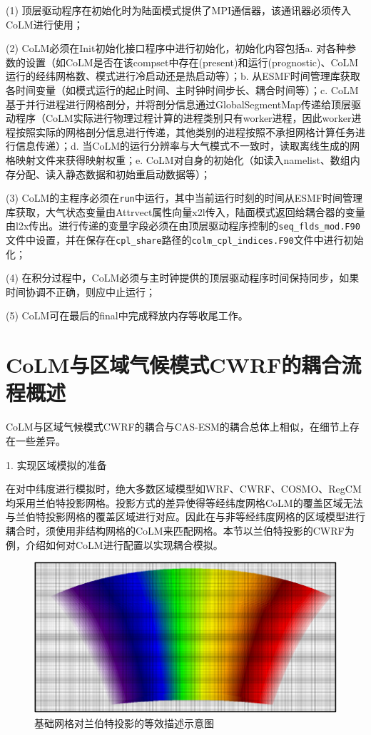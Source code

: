 (1) 顶层驱动程序在初始化时为陆面模式提供了MPI通信器，该通讯器必须传入CoLM进行使用；

(2) CoLM必须在Init初始化接口程序中进行初始化，初始化内容包括a. 对各种参数的设置（如CoLM是否在该compset中存在(present)和运行(prognostic)、CoLM运行的经纬网格数、模式进行冷启动还是热启动等）；b. 从ESMF时间管理库获取各时间变量（如模式运行的起止时间、主时钟时间步长、耦合时间等）；c. CoLM基于并行进程进行网格剖分，并将剖分信息通过GlobalSegmentMap传递给顶层驱动程序（CoLM实际进行物理过程计算的进程类别只有worker进程，因此worker进程按照实际的网格剖分信息进行传递，其他类别的进程按照不承担网格计算任务进行信息传递）；d. 当CoLM的运行分辨率与大气模式不一致时，读取离线生成的网格映射文件来获得映射权重；e. CoLM对自身的初始化（如读入namelist、数组内存分配、读入静态数据和初始重启动数据等）；

(3) CoLM的主程序必须在\texttt{run}中运行，其中当前运行时刻的时间从ESMF时间管理库获取，大气状态变量由Attrvect属性向量x2l传入，陆面模式返回给耦合器的变量由l2x传出。进行传递的变量字段必须在由顶层驱动程序控制的\texttt{seq\_flds\_mod.F90}文件中设置，并在保存在\texttt{cpl\_share}路径的\texttt{colm\_cpl\_indices.F90}文件中进行初始化；

(4) 在积分过程中，CoLM必须与主时钟提供的顶层驱动程序时间保持同步，如果时间协调不正确，则应中止运行；

(5) CoLM可在最后的final中完成释放内存等收尾工作。


\chapter{CoLM与区域气候模式CWRF的耦合流程概述}\label{CoLM与CWRF的耦合}

CoLM与区域气候模式CWRF的耦合与CAS-ESM的耦合总体上相似，在细节上存在一些差异。

1. 实现区域模拟的准备

在对中纬度进行模拟时，绝大多数区域模型如WRF、CWRF、COSMO、RegCM均采用兰伯特投影网格。投影方式的差异使得等经纬度网格CoLM的覆盖区域无法与兰伯特投影网格的覆盖区域进行对应。因此在与非等经纬度网格的区域模型进行耦合时，须使用非结构网格的CoLM来匹配网格。本节以兰伯特投影的CWRF为例，介绍如何对CoLM进行配置以实现耦合模拟。

{
\begin{figure}[htbp]
\centering
\includegraphics{Figures/附录/基础网格对兰伯特投影的等效描述示意图.png}
\caption{基础网格对兰伯特投影的等效描述示意图}
\label{fig:兰伯特投影的等效描述示意图}
\end{figure}
}

